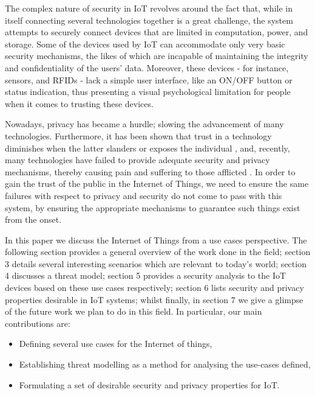\documentclass{llncs}
\begin{document}
The complex nature of security in IoT revolves around the fact that, while in itself connecting several technologies together is a great challenge, the system attempts to securely connect devices that are limited in computation, power, and storage. Some of the devices used by IoT can accommodate only very basic security mechanisms, the likes of which are incapable of maintaining the integrity and confidentiality of the users' data. Moreover, these devices - for instance, sensors, and RFIDs - lack a simple user interface, like an ON/OFF button or status indication, thus presenting a visual psychological limitation for people when it comes to trusting these devices. 

Nowadays, privacy has became a hurdle; slowing the advancement of many technologies\cite{Xu2011}. Furthermore, it has been shown that trust in a technology diminishes when the latter slanders or exposes the individual \cite{oxford2013,Scandal2014,Best2014}, and, recently, many technologies have failed to provide adequate security and privacy mechanisms, thereby causing pain and suffering to those afflicted \cite{Hinduja2010}. In order to gain the trust of the public in the Internet of Things, we need to ensure the same failures with respect to privacy and security do not come to pass with this system, by ensuring the appropriate mechanisms to guarantee such things exist from the onset. 

In this paper we discuss the Internet of Things from a use cases perspective. The following section provides a general overview of the work done in the field; section 3 details several interesting scenarios which are relevant to today's world; section 4 discusses a threat model; section 5 provides a security analysis to the IoT devices based on these use cases respectively; section 6 lists security and privacy properties desirable in IoT systems; whilst finally, in section 7 we give a glimpse of the future work we plan to do in this field.
In particular, our main contributions are:
\begin{itemize}
\item Defining several use cases for the Internet of things,
\item Establishing threat modelling as a method for analysing the use-cases defined,
\item Formulating a set of desirable security and privacy properties for IoT.

\end{itemize}
\end{document}
